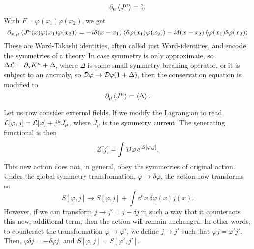 %
\begin{equation}
    \partial_\mu \Braket{J^\mu} = 0.
\end{equation}
%
With $F = \varphi(x_1) \varphi(x_2)$, we get~\autocite{schwartzQuantumFieldTheory2013,peskinIntroductionQuantumField1995}
%
\begin{equation}
    \partial_{x, \mu} \braket{J^\mu (x)\varphi(x_1) \varphi(x_2)}
    = -i \delta(x - x_1) \braket{\delta \varphi(x_1) \varphi(x_2)}
    - i \delta(x - x_2) \braket{\varphi(x_1) \delta \varphi(x_2)}
\end{equation}
%
These are Ward-Takashi identities, often called just Ward-identities, and encode the symmetries of a theory.
In case symmetry is only approximate, so $\Delta \mathcal{L} = \partial_\mu K^\mu + \Delta$, where $\Delta$ is some small symmetry breaking operator, or it is subject to an anomaly, so $\mathcal D \varphi \rightarrow \mathcal D \varphi (1 + \Delta)$, then the conservation equation is modified to
%
\begin{equation}
    \partial_\mu \Braket{J^\mu} = \Braket{\Delta}.
\end{equation}

Let us now consider external fields.
If we modify the Lagrangian to read $\mathcal{L}[\varphi, j] = \mathcal{L}[\varphi] + j^\mu J_\mu$, where $J_\mu$ is the symmetry current.
The generating functional is then
%
\begin{equation}
    Z[j] = \int\mathcal D \varphi \, e^{iS[\varphi, j]}.
\end{equation}
%
This new action does not, in general, obey the symmetries of original action.
Under the global symmetry transformation, $\varphi \rightarrow \delta \varphi$, the action now transforms as
%
\begin{equation}
    S[\varphi, j] \rightarrow S[\varphi, j] + \int \dd^n x \, \delta \varphi(x) j(x).
\end{equation}
%
However, if we can transform $j \rightarrow j' = j + \delta j$ in such a way that it counteracts this new, additional term, then the action will remain unchanged.
In other words, to counteract the transformation $\varphi \rightarrow \varphi'$, we define $j \rightarrow j'$ such that $\varphi j = \varphi' j'$.
Then, $\varphi \delta j = -\delta \varphi j$, and $S[\varphi, j] = S[\varphi', j']$.

